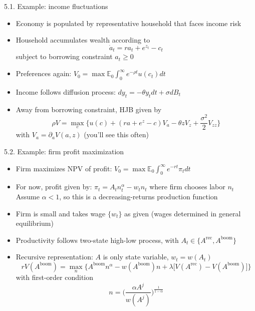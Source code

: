 \documentclass[10pt]{beamer}
\begin{document}
\begin{frame}{5.1. Example: income fluctuations}
\begin{itemize}
\item Economy is populated by representative household that faces income risk

\item Household accumulates wealth according to
\begin{equation*}
	\dot a_t = r a_t + e^{z_t} - c_t 
\end{equation*}
subject to borrowing constraint $a_t \geq 0$

\item Preferences again: $V_0 = \max \mathbb{E}_0 \int_0^\infty e^{- \rho t} u(c_t) dt$

\item Income follows diffusion process: $d y_t = - \theta y_t dt + \sigma dB_t$

\item Away from borrowing constraint, HJB given by
\begin{equation*}
	\rho V = \max_c \Big\{ u(c) + (r a + e^{z} - c) V_a - \theta z V_z + \frac{\sigma^2}{2} V_{zz} \Big\}
\end{equation*}
with $V_a = \partial_a V(a, z)$ (you'll see this often) 
\end{itemize}
\end{frame}


\begin{frame}{5.2. Example: firm profit maximization}
\begin{itemize}
\item Firm maximizes NPV of profit: $V_0 = \max \mathbb{E}_0 \int_0^\infty e^{- r t} \pi_t dt$

\item For now, profit given by: $\pi_t = A_t n_t^\alpha - w_t n_t$ where firm chooses labor $n_t$ \\
Assume $\alpha < 1$, so this is a decreasing-returns production function

\item Firm is small and takes wage $\{ w_t \}$ as given (wages determined in general equilibrium)

\item Productivity follows two-state high-low process, with $A_t \in \{ A^\text{rec}, A^\text{boom} \}$

\item Recursive representation: $A$ is only state variable, $w_t = w(A_t)$
\begin{equation*}
	r V(A^\text{boom}) = \max_n \Big\{ A^\text{boom} n^\alpha - w(A^\text{boom}) n + \lambda \Big[ V(A^\text{rec}) - V(A^\text{boom}) \Big] \Big\}
\end{equation*}
with first-order condition
\begin{equation*}
	n = \bigg(\frac{\alpha A^j}{w(A^j)}\bigg)^\frac{1}{1-\alpha}
\end{equation*}

\end{itemize}
\end{frame}
\end{document}
